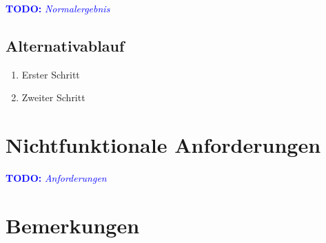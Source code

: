 \documentclass[11pt,final,hidelinks,bibliography=totoc,]{scrartcl}
\newcommand{\TODO}[1][Viel zu tun...]{\textcolor{blue}{\textbf{TODO:}} \textcolor{blue}{\textit{#1}}}
\begin{document}
\TODO[Normalergebnis]

\subsection{Alternativablauf}

\begin{enumerate}
\item Erster Schritt
\item Zweiter Schritt
\end{enumerate}

\section{Nichtfunktionale Anforderungen}

\TODO[Anforderungen]

\section{Bemerkungen}
\end{document}
